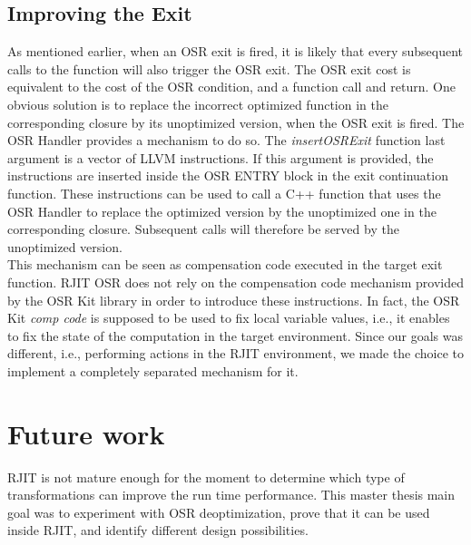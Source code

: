 \subsection{Improving the Exit}
As mentioned earlier, when an OSR exit is fired, it is likely that every subsequent calls to the function will also trigger the OSR exit.
The OSR exit cost is equivalent to the cost of the OSR condition, and a function call and return.
One obvious solution is to replace the incorrect optimized function in the corresponding closure by its unoptimized version, when the OSR exit is fired.
The OSR Handler provides a mechanism to do so.
The \textit{insertOSRExit} function last argument is a vector of LLVM instructions.
If this argument is provided, the instructions are inserted inside the OSR ENTRY block in the exit continuation function.
These instructions can be used to call a C++ function that uses the OSR Handler to replace the optimized version by the unoptimized one in the corresponding closure.
Subsequent calls will therefore be served by the unoptimized version.\\

This mechanism can be seen as compensation code executed in the target exit function.
RJIT OSR does not rely on the compensation code mechanism provided by the OSR Kit library in order to introduce these instructions.
In fact, the OSR Kit \textit{comp code} is supposed to be used to fix local variable values, i.e., it enables to fix the state of the computation in the target environment. 
Since our goals was different, i.e., performing actions in the RJIT environment, we  made the choice to implement a completely separated mechanism for it.\\ 

\section{Future work}
RJIT is not mature enough for the moment to determine which type of transformations can improve the run time performance.
This master thesis main goal was to experiment with OSR deoptimization, prove that it can be used inside RJIT, and identify different design possibilities.\\


